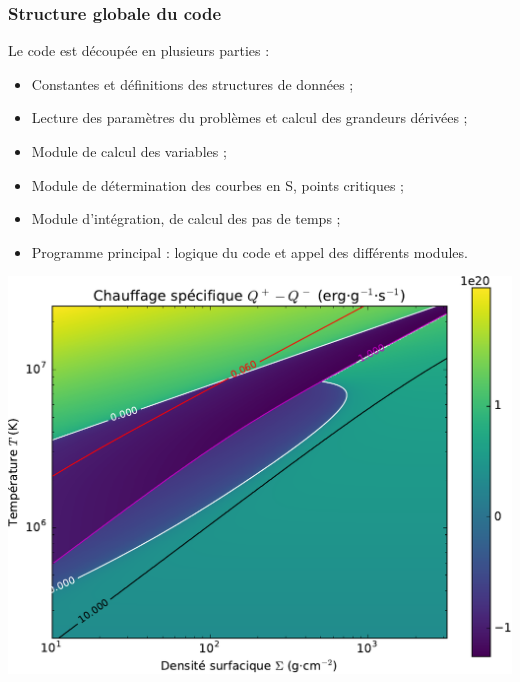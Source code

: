 \documentclass[french]{beamer}
\begin{document}


\begin{frame}
    \frametitle{Structure globale du code}
    Le code est découpée en plusieurs parties :
    \begin{itemize}
        \item Constantes et définitions des structures de données ;
        \item Lecture des paramètres du problèmes et calcul des grandeurs dérivées ;
        \item Module de calcul des variables ;
        \item Module de détermination des courbes en S, points critiques ;
        \item Module d’intégration, de calcul des pas de temps ;
        \item Programme principal : logique du code et appel des différents modules.
    \end{itemize}
\end{frame}

\begin{frame}
    \begin{algorithm}[H]
    \end{algorithm}
\end{frame}

\begin{frame}
    \includegraphics[width=\textwidth]{Qmap.pdf}
\end{frame}
\end{document}

